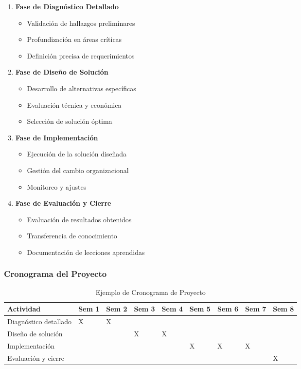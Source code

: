 \documentclass[12pt,letterpaper,oneside]{book}
\begin{document}
\begin{enumerate}
\item \textbf{Fase de Diagnóstico Detallado}
   \begin{itemize}
   \item Validación de hallazgos preliminares
   \item Profundización en áreas críticas
   \item Definición precisa de requerimientos
   \end{itemize}

\item \textbf{Fase de Diseño de Solución}
   \begin{itemize}
   \item Desarrollo de alternativas específicas
   \item Evaluación técnica y económica
   \item Selección de solución óptima
   \end{itemize}

\item \textbf{Fase de Implementación}
   \begin{itemize}
   \item Ejecución de la solución diseñada
   \item Gestión del cambio organizacional
   \item Monitoreo y ajustes
   \end{itemize}

\item \textbf{Fase de Evaluación y Cierre}
   \begin{itemize}
   \item Evaluación de resultados obtenidos
   \item Transferencia de conocimiento
   \item Documentación de lecciones aprendidas
   \end{itemize}
\end{enumerate}

\subsubsection{Cronograma del Proyecto}

\begin{table}[H]
\centering
\caption{Ejemplo de Cronograma de Proyecto}
\scriptsize
\begin{tabular}{|p{3cm}|p{1cm}|p{1cm}|p{1cm}|p{1cm}|p{1cm}|p{1cm}|p{1cm}|p{1cm}|}
\hline
\textbf{Actividad} & \textbf{Sem 1} & \textbf{Sem 2} & \textbf{Sem 3} & \textbf{Sem 4} & \textbf{Sem 5} & \textbf{Sem 6} & \textbf{Sem 7} & \textbf{Sem 8} \\
\hline
Diagnóstico detallado & X & X & & & & & & \\
\hline
Diseño de solución & & & X & X & & & & \\
\hline
Implementación & & & & & X & X & X & \\
\hline
Evaluación y cierre & & & & & & & & X \\
\hline
\end{tabular}
\end{table}
\end{document}
